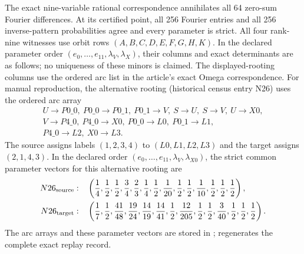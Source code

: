 \documentclass[11pt]{article}
\begin{document}
The exact nine-variable rational correspondence annihilates all 64 zero-sum
Fourier differences.  At its certified point, all 256 Fourier entries and all
256 inverse-pattern probabilities agree and every parameter is strict.  All
four rank-nine witnesses use orbit rows $(A,B,C,D,E,F,G,H,K)$.  In the
declared parameter order $(e_0,\ldots,e_{11},\lambda_V,\lambda_X)$, their
columns and exact determinants are as follows; no uniqueness of these minors
is claimed.  The displayed-rooting columns use the ordered arc list in the
article's exact Omega correspondence.  For manual reproduction, the
alternative rooting (historical census entry N26) uses the ordered arc array
\[
\begin{gathered}
U\to P0\_0,\ P0\_0\to P0\_1,\ P0\_1\to V,\ S\to U,\ S\to V,\ U\to X0,\\
V\to P4\_0,\ P4\_0\to X0,\ P0\_0\to L0,\ P0\_1\to L1,\\
P4\_0\to L2,\ X0\to L3.
\end{gathered}
\]
The source assigns labels $(1,2,3,4)$ to $(L0,L1,L2,L3)$ and the target
assigns $(2,1,4,3)$.  In the declared order
$(e_0,\ldots,e_{11},\lambda_V,\lambda_{X0})$, the strict common parameter
vectors for this alternative rooting are
\[
\begin{aligned}
N26_{\rm source}:\quad
&\left(\frac14,\frac12,\frac12,\frac34,\frac23,\frac14,\frac12,
\frac1{20},\frac12,\frac12,\frac1{10},\frac12,\frac12,\frac12\right),\\
N26_{\rm target}:\quad
&\left(\frac17,\frac12,\frac{41}{48},\frac{19}{24},\frac{14}{19},
\frac{14}{41},\frac12,\frac{12}{205},\frac12,\frac12,\frac3{40},
\frac12,\frac12,\frac12\right).
\end{aligned}
\]
The arc arrays and these parameter vectors are stored in
;
 regenerates the
complete exact replay record.
\end{document}

